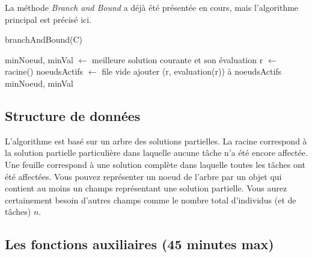 \documentclass[a4paper,francais]{article}
\theoremstyle{definition}
\begin{document}
La méthode \emph{Branch and Bound} a déjà été présentée en cours,
mais l'algorithme principal est précisé ici. 

  \begin{algorithm}[H]
    \caption{branchAndBound(C)}
    \label{alg:bb}
    minNoeud, minVal $\leftarrow$ meilleure solution courante et son évaluation \;
    r $\leftarrow$ racine() \;
    noeudsActifs $\leftarrow$ file vide \;
    ajouter (r, evaluation(r)) à noeudsActifs \; 
    \Return minNoeud, minVal
  \end{algorithm}

\subsection{Structure de données}

L'algorithme est basé sur un arbre des solutions partielles. La racine
correspond à la solution partielle particulière dans laquelle aucune tâche
n'a été encore affectée. Une feuille correspond à une solution complète
dans laquelle toutes les tâches ont été affectées. 
Vous pouvez représenter un noeud de l'arbre par un objet qui contient
au moins un champs représentant une solution partielle. Vous aurez certainement
besoin d'autres champs comme le nombre total d'individus (et de tâches) $n$. 

\subsection{Les fonctions auxiliaires (45 minutes max)}
\end{document}
